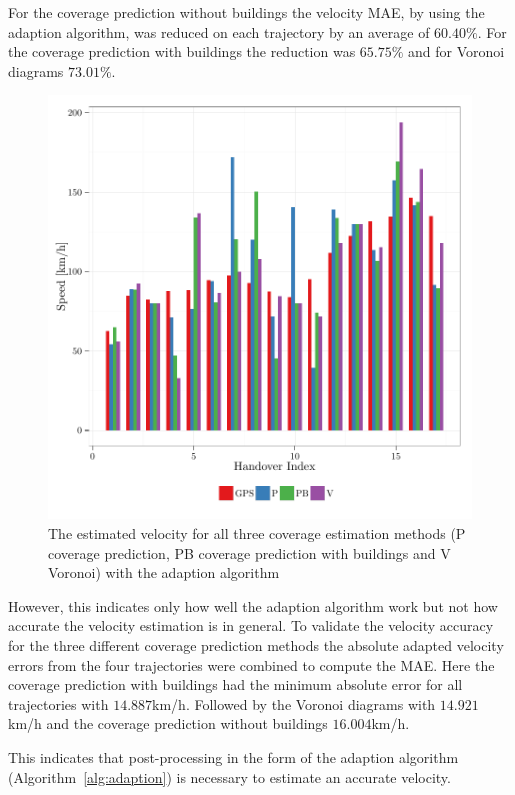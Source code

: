 For the coverage prediction without buildings the velocity MAE, by using the adaption algorithm, was reduced on each trajectory by an average of $60.40\%$. For the coverage prediction with buildings the reduction was $65.75\%$ and for Voronoi diagrams $73.01\%$. 
\begin{figure}[h!]
		\label{fig:velocityadaption}
		\caption{ The estimated velocity for all three coverage estimation methods (P coverage prediction, PB coverage prediction with buildings and V Voronoi) with the adaption algorithm
		}
		\includegraphics[width=0.9\columnwidth]{images/563_SpeedsWithAdaption}
	\end{figure}
However, this indicates only how well the adaption algorithm work but not how accurate the velocity estimation is in general. To validate the velocity accuracy for the three different coverage prediction methods the absolute adapted velocity errors from the four trajectories were combined to compute the MAE. Here the coverage prediction with buildings had the minimum absolute error for all trajectories with $14.887$km/h. Followed by the Voronoi diagrams with $14.921$km/h and the coverage prediction without buildings $16.004$km/h. 

This indicates that post-processing in the form of the adaption algorithm (Algorithm~\ref{alg:adaption}) is necessary to estimate an accurate velocity. 

